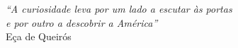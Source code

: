 \cleardoublepage
\thispagestyle{plain}

\vspace*{8cm}

\begin{flushright}
   \textsl{``A curiosidade leva por um lado a escutar às portas \\
   					e por outro a descobrir a América''} \\
\vspace*{1.5cm}
           Eça de Queirós
\end{flushright}
